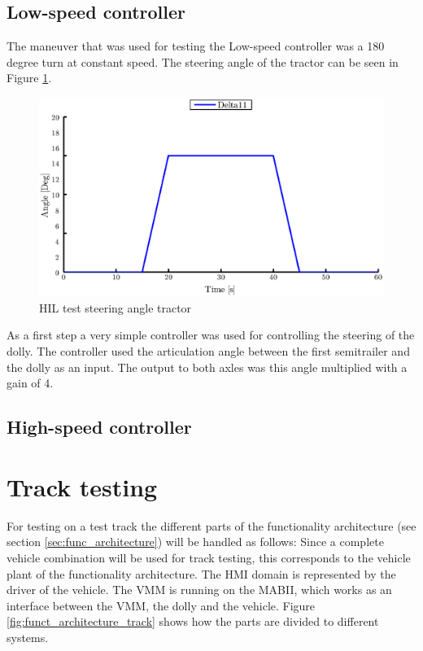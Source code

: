 \documentclass[ExampleMasters.tex]{subfiles}
\begin{document}
\subsection{Low-speed controller}
The maneuver that was used for testing the Low-speed controller was a 180 degree turn at constant speed. The steering angle of the tractor can be seen in Figure \ref{fig:HIL002_delta11}.\\
\begin{figure}[!htb]
	\centering
	\includegraphics[width=0.7\linewidth]{figures/HIL_delta11}
	\caption{HIL test steering angle tractor}
	
	\label{fig:HIL002_delta11}
\end{figure}
As a first step a very simple controller was used for controlling the steering of the dolly. The controller used the articulation angle between the first semitrailer and the dolly as an input. The output to both axles was this angle multiplied with a gain of 4.



\subsection{High-speed controller}

\section{Track testing}
\label{sec:track-testing}
For testing on a test track the different parts of the  functionality architecture (see section \ref{sec:func_architecture}) will be handled as follows:
Since a complete vehicle combination will be used for track testing, this corresponds to the vehicle plant of the functionality architecture. The \gls{HMI} domain is represented by the driver of the vehicle. The \gls{VMM} is running on the \gls{MABII}, which works as an interface between the \gls{VMM}, the dolly and the vehicle. Figure \ref{fig:funct_architecture_track} shows how the parts are divided to different systems.
\end{document}
